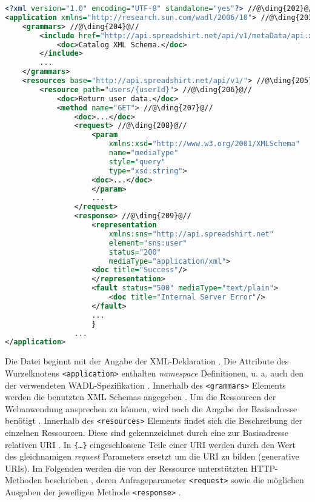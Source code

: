 \begin{minipage}{\textwidth}
\begin{lstlisting}[language=XML, caption={Beispielaufbau einer \gls{WADL}-Datei anhand der Spreadshirt-\gls{API} Beschreibung}, label=lst:wadlstructure, name=wadlstructure]
<?xml version="1.0" encoding="UTF-8" standalone="yes"?> //@\ding{202}@//
<application xmlns="http://research.sun.com/wadl/2006/10"> //@\ding{203}@//
    <grammars> //@\ding{204}@//
        <include href="http://api.spreadshirt.net/api/v1/metaData/api.xsd">
            <doc>Catalog XML Schema.</doc>
        </include>
        ...
    </grammars>
    <resources base="http://api.spreadshirt.net/api/v1/"> //@\ding{205}@//
        <resource path="users/{userId}"> //@\ding{206}@//
            <doc>Return user data.</doc>
            <method name="GET"> //@\ding{207}@//
                <doc>...</doc>
                <request> //@\ding{208}@//
                    <param 
                        xmlns:xsd="http://www.w3.org/2001/XMLSchema" 
                        name="mediaType" 
                        style="query" 
                        type="xsd:string">
                    <doc>...</doc>
                    </param>
                    ...
                </request>
                <response> //@\ding{209}@//
                    <representation 
                        xmlns:sns="http://api.spreadshirt.net"
                        element="sns:user" 
                        status="200" 
                        mediaType="application/xml">
                    <doc title="Success"/>
                    </representation>
                    <fault status="500" mediaType="text/plain">
                        <doc title="Internal Server Error"/>
                    </fault>
                    ...
                    }
                ...
</application>
\end{lstlisting}
\end{minipage}

Die Datei beginnt mit der Angabe der \gls{XML}-Deklaration .
Die Attribute des Wurzelknotens \texttt{<application>} enthalten \emph{namespace} Definitionen, u. a. auch den der verwendeten \gls{WADL}-Spezifikation .
Innerhalb des \texttt{<grammars>} Elements werden die benutzten \gls{XML} Schemas angegeben . 
Um die Ressourcen der Webanwendung ansprechen zu können, wird noch die Angabe der Basisadresse benötigt . 
Innerhalb des \texttt{<resources>} Elements findet sich die Beschreibung der einzelnen Ressourcen. Diese sind gekennzeichnet durch eine zur Basisadresse relativen \gls{URI} . In \texttt{\{\ldots\}} eingeschlossene Teile einer \gls{URI} werden durch den Wert des gleichnamigen \emph{request} Parameters ersetzt um die \gls{URI} zu bilden (generative \glspl{URI}).
Im Folgenden werden die von der Ressource unterstützten \gls{HTTP}-Methoden beschrieben , deren Anfrageparameter \texttt{<request>}  sowie die möglichen Ausgaben der jeweiligen Methode \texttt{<response>} .

